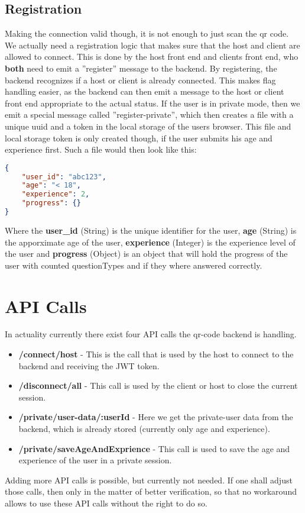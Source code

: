 \subsection{Registration}
Making the connection valid though, it is not enough to just scan the qr code.
We actually need a registration logic that makes sure that the host and client are allowed to connect.
This is done by the host front end and clients front end, who \textbf{both} need to emit a ''register'' message to the backend.
By registering, the backend recognizes if a host or client is already connected.
This makes flag handling easier, as the backend can then emit a message to the host or client front end appropriate to the actual status.
If the user is in private mode, then we emit a special message called ''register-private'', 
which then creates a file with a unique uuid and a token in the local storage of the users browser.
This file and local storage token is only created though, if the user submits his age and experience first.
Such a file would then look like this:
\begin{lstlisting}[language=json,firstnumber=1]
{
    "user_id": "abc123",
    "age": "< 18",
    "experience": 2,
    "progress": {}
}
\end{lstlisting}
Where the \textbf{user\_id} (String) is the unique identifier for the user, 
\textbf{age} (String) is the apporximate age of the user, 
\textbf{experience} (Integer) is the experience level of the user and 
\textbf{progress} (Object) is an object that will hold the progress of the user with counted questionTypes and if they where answered correctly.

\section{API Calls}
In actuality currently there exist four API calls the qr-code backend is handling.
\begin{itemize}
    \item \textbf{/connect/host} - This is the call that is used by the host to connect to the backend and receiving the JWT token.
    \item \textbf{/disconnect/all} - This call is used by the client or host to close the current session.
    \item \textbf{/private/user-data/:userId} - Here we get the private-user data from the backend, which is already stored (currently only age and experience).
    \item \textbf{/private/saveAgeAndExprience} - This call is used to save the age and experience of the user in a private session.
\end{itemize}
Adding more API calls is possible, but currently not needed.
If one shall adjust those calls, then only in the matter of better verification, so that no workaround allows to use these API calls without the right to do so.